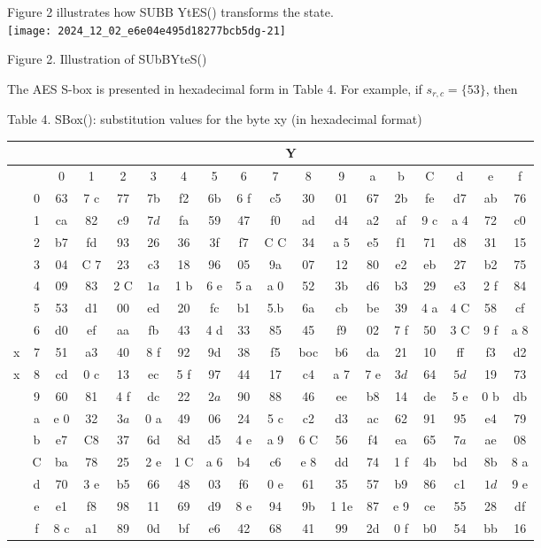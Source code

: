 Figure 2 illustrates how SUBB YtES() transforms the state.\\
\texttt{[image: 2024\_12\_02\_e6e04e495d18277bcb5dg-21]}

Figure 2. Illustration of SUbBYteS()

The AES S-box is presented in hexadecimal form in Table 4. For example, if \(s_{r, c}=\{53\}\), then

Table 4. SBox(): substitution values for the byte xy (in hexadecimal format)

\begin{center}
\begin{tabular}{|c|c|c|c|c|c|c|c|c|c|c|c|c|c|c|c|c|c|}
\hline
 &  & \multicolumn{16}{|c|}{Y} \\
\hline
 &  & 0 & 1 & 2 & 3 & 4 & 5 & 6 & 7 & 8 & 9 & a & b & C & d & e & f \\
\hline
 & 0 & 63 & 7 c & 77 & 7b & f2 & 6b & 6 f & c5 & 30 & 01 & 67 & 2b & fe & d7 & ab & 76 \\
\hline
 & 1 & ca & 82 & c9 & \(7 d\) & fa & 59 & 47 & f0 & ad & d4 & a2 & af & 9 c & a 4 & 72 & c0 \\
\hline
 & 2 & b7 & fd & 93 & 26 & 36 & 3f & f7 & C C & 34 & a 5 & e5 & f1 & 71 & d8 & 31 & 15 \\
\hline
 & 3 & 04 & C 7 & 23 & c3 & 18 & 96 & 05 & 9a & 07 & 12 & 80 & e2 & eb & 27 & b2 & 75 \\
\hline
 & 4 & 09 & 83 & 2 C & \(1 a\) & 1 b & 6 e & 5 a & a 0 & 52 & 3b & d6 & b3 & 29 & e3 & 2 f & 84 \\
\hline
 & 5 & 53 & d1 & 00 & ed & 20 & fc & b1 & 5.b & 6a & cb & be & 39 & 4 a & 4 C & 58 & cf \\
\hline
 & 6 & d0 & ef & aa & fb & 43 & 4 d & 33 & 85 & 45 & f9 & 02 & 7 f & 50 & 3 C & 9 f & a 8 \\
\hline
x & 7 & 51 & a3 & 40 & 8 f & 92 & 9d & 38 & f5 & boc & b6 & da & 21 & 10 & ff & f3 & d2 \\
\hline
x & 8 & cd & 0 c & 13 & ec & 5 f & 97 & 44 & 17 & c4 & a 7 & 7 e & \(3 d\) & 64 & \(5 d\) & 19 & 73 \\
\hline
 & 9 & 60 & 81 & 4 f & dc & 22 & \(2 a\) & 90 & 88 & 46 & ee & b8 & 14 & de & 5 e & 0 b & db \\
\hline
 & a & e 0 & 32 & \(3 a\) & 0 a & 49 & 06 & 24 & 5 c & c2 & d3 & ac & 62 & 91 & 95 & e4 & 79 \\
\hline
 & b & e7 & C8 & 37 & 6d & 8d & d5 & 4 e & a 9 & 6 C & 56 & f4 & ea & 65 & \(7 a\) & ae & 08 \\
\hline
 & C & ba & 78 & 25 & 2 e & 1 C & a 6 & b4 & c6 & e 8 & dd & 74 & 1 f & 4b & bd & 8b & 8 a \\
\hline
 & d & 70 & 3 e & b5 & 66 & 48 & 03 & f6 & 0 e & 61 & 35 & 57 & b9 & 86 & c1 & \(1 d\) & 9 e \\
\hline
 & e & e1 & f8 & 98 & 11 & 69 & d9 & 8 e & 94 & 9b & 1 1e & 87 & e 9 & ce & 55 & 28 & df \\
\hline
 & f & 8 c & a1 & 89 & 0d & bf & e6 & 42 & 68 & 41 & 99 & 2d & 0 f & b0 & 54 & bb & 16 \\
\hline
\end{tabular}
\end{center}

